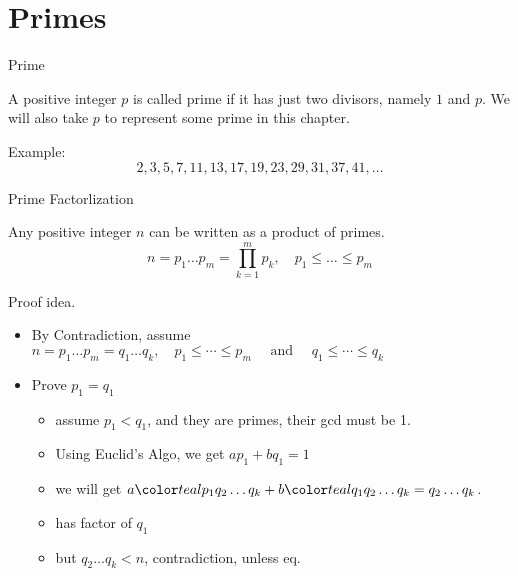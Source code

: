\section{Primes}
\begin{frame}{Prime}
    \begin{definition}
         A positive integer $p$ is called prime if it has just two divisors, namely $1$ and $p$. We will also take $p$ to represent some prime in this chapter. 
    \end{definition}

    Example: 
    $$
    2,3,5,7,11,13,17,19,23,29,31,37,41, \ldots
    $$
    
\end{frame}

\begin{frame}{Prime Factorlization}

\begin{theorem}
    Any positive integer $n$ can be written as a product of primes. 
    $${n}={p}_1 \ldots {p}_{{m}}=\prod_{k=1}^m {p}_{{k}}, \quad {p}_1 \leqslant \ldots \leqslant {p}_{{m}}$$
\end{theorem}

Proof idea. 

\begin{itemize}
    \item By Contradiction, assume ${n}={p}_1 \ldots {p}_{{m}}={q}_1 \ldots {q}_{{k}}, \quad {p}_1 \leqslant \cdots \leqslant {p}_{{m}} \quad \text { and } \quad {q}_1 \leqslant \cdots \leqslant {q}_{{k}}$
    \item Prove $p_1=q_1$
    \begin{itemize}
        \item assume $p_1<q_1$, and they are primes, their gcd must be 1. 
        \item Using Euclid's Algo, we get $a p_1+b q_1=1$
        \item we will get $a \teal{p_1} q_2 \ldots q_k+b \teal{q_1 q_2 \ldots q_k}=q_2 \ldots q_k$.
        \item {} has factor of $q_1$
        \item but ${q}_2 \ldots {q}_{{k}}<{n}$, contradiction, unless eq. 
    \end{itemize}

\end{itemize}
    
\end{frame}

